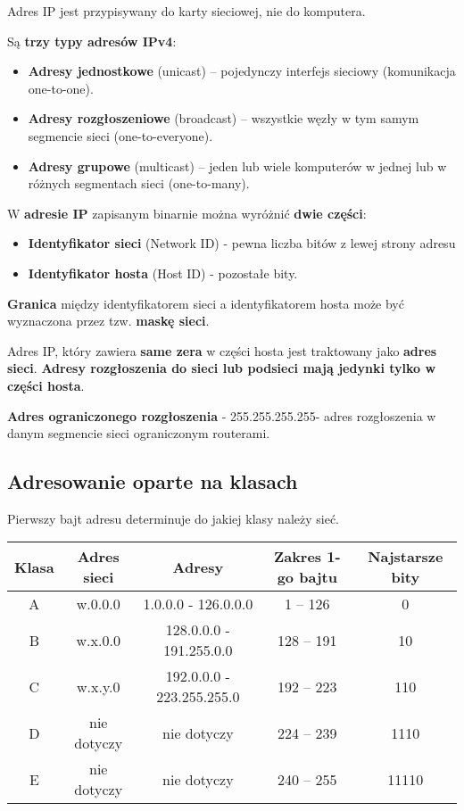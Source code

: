 \documentclass[../main.tex]{subfiles}
\begin{document}
    Adres IP jest przypisywany do karty sieciowej, nie do komputera.

    Są \textbf{trzy typy adresów IPv4}:
    \begin{itemize}
        \item \textbf{Adresy jednostkowe} (unicast) – pojedynczy interfejs sieciowy (komunikacja one-to-one).
        \item \textbf{Adresy rozgłoszeniowe} (broadcast) – wszystkie węzły w tym samym segmencie sieci (one-to-everyone).
        \item \textbf{Adresy grupowe} (multicast) – jeden lub wiele komputerów w jednej lub w różnych segmentach sieci (one-to-many).
    \end{itemize}

    W \textbf{adresie IP} zapisanym binarnie można wyróżnić \textbf{dwie części}:
    \begin{itemize}
        \item \textbf{Identyfikator sieci} (Network ID) - pewna liczba bitów z lewej strony adresu
        \item \textbf{Identyfikator hosta} (Host ID) - pozostałe bity.
    \end{itemize}
    \textbf{Granica} między identyfikatorem sieci a identyfikatorem hosta może być wyznaczona przez
    tzw. \textbf{maskę sieci}.

    Adres IP, który zawiera \textbf{same zera} w części hosta jest traktowany jako \textbf{adres sieci}.
    \textbf{Adresy rozgłoszenia do sieci lub podsieci mają jedynki tylko w części hosta}.

    \textbf{Adres ograniczonego rozgłoszenia} - 255.255.255.255- adres rozgłoszenia
    w danym segmencie sieci ograniczonym routerami.\\

    \subsection{Adresowanie oparte na klasach}

    Pierwszy bajt adresu determinuje do jakiej klasy należy sieć.

\begin{adjustbox}{width=\columnwidth,center}
    \begin{tabular}{|c|c|c|c|c|}
        \hline
        Klasa & Adres sieci & Adresy & Zakres 1-go bajtu & Najstarsze bity\\
        \hline
        A & w.0.0.0 & 1.0.0.0 - 126.0.0.0 & 1 – 126 & 0\\
        \hline
        B & w.x.0.0 & 128.0.0.0 - 191.255.0.0 & 128 – 191 & 10\\
        \hline
        C & w.x.y.0 & 192.0.0.0 - 223.255.255.0 & 192 – 223 & 110\\
        \hline
        D & nie dotyczy & nie dotyczy & 224 – 239 & 1110\\
        \hline
        E & nie dotyczy & nie dotyczy & 240 – 255 & 11110\\
        \hline
    \end{tabular}
\end{adjustbox}
\end{document}

